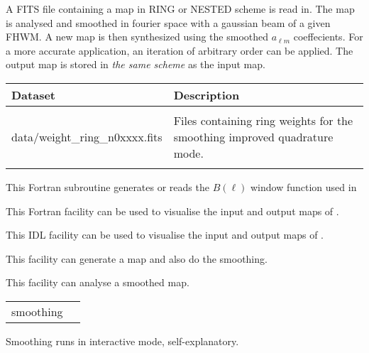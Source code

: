 \begin{codedescription}
{
A FITS file containing a \healpix map in RING or NESTED scheme is read in.
The map is analysed and smoothed in fourier space with a  gaussian beam 
of a given FHWM. 
A new map is then synthesized using the smoothed $a_{\ell m}$ coeffecients. 
For a more accurate application, an iteration of arbitrary order can be applied. 
The output map is stored in {\em the same scheme} as the input map.
}
\end{codedescription}

\begin{datasets}
{
\begin{tabular}{p{0.3\hsize} p{0.35\hsize}} \hline  
  \textbf{Dataset} & \textbf{Description} \\ \hline
                   &                      \\ %
  data/weight\_ring\_n0xxxx.fits & Files containing ring weights
                   for the smoothing improved quadrature mode.\\ 
                   &                      \\ \hline %
\end{tabular}
} 
\end{datasets}

\begin{support}
  \begin{sulist}{} %
  \item[\htmlref{generate\_beam}{sub:generate_beam}] This \healpix Fortran
subroutine generates or reads the $B(\ell)$ window function used in \thedocid
  \item[\htmlref{map2gif}{fac:map2gif}] This \healpix Fortran facility can be used to visualise the
  input and output maps of \thedocid.
  \item[\htmlref{mollview}{idl:mollview}] This \healpix IDL facility can be used to visualise the
  input and output maps of \thedocid.
  \item[\htmlref{synfast}{fac:synfast}] This \healpix facility can generate a map and also do the smoothing.
  \item[\htmlref{anafast}{fac:anafast}] This \healpix facility can analyse a smoothed map.		
  \end{sulist}
\end{support}

\begin{examples}{1}
{
\begin{tabular}{ll} %
smoothing  \\
\end{tabular}
}
{
Smoothing runs in interactive mode, self-explanatory. 
}
\end{examples}

